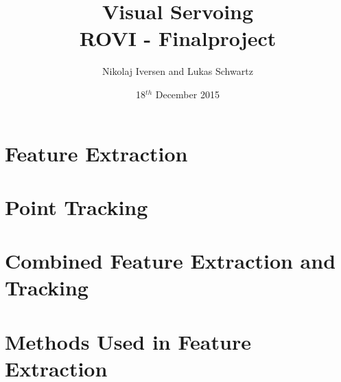 \documentclass[12pt,a4paper,conference]{IEEEtran}
\begin{document}
\raggedbottom

\title{Visual Servoing\\ \large{ROVI - Finalproject}}
\author{Nikolaj Iversen and Lukas Schwartz}
\date{18$^{th}$ December 2015}

\maketitle


\section{Feature Extraction}




\section{Point Tracking}





\section{Combined Feature Extraction and Tracking}
\label{sec:combinedSystem}




\pagebreak
\appendices

\section{Methods Used in Feature Extraction}\label{app:full_vision_part} 



\end{document}
